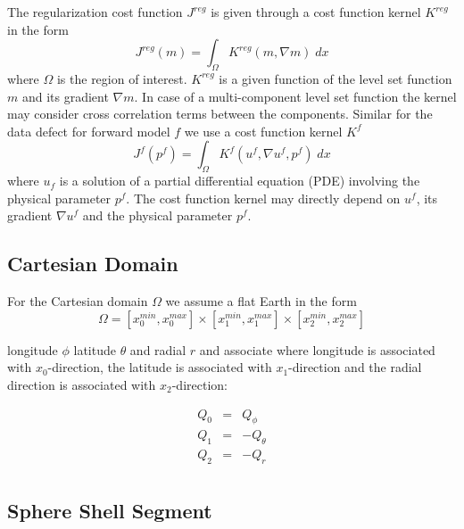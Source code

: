 The regularization cost function $J^{reg}$ is given through a cost function kernel $K^{reg}$ in the form
\begin{equation}\label{REF:EQU:INTRO 2a}
J^{reg}(m) = \int_{\Omega} K^{reg}(m, \nabla m) \; dx
\end{equation} 
where $\Omega$ is the region of interest. $K^{reg}$ is a given function of the level set function $m$ and its gradient $\nabla m$.
In case of a multi-component level set function the kernel may consider cross correlation terms between the components.
Similar for the data defect for forward model $f$ we use a cost function kernel $K^{f}$ 
\begin{equation}\label{REF:EQU:INTRO 2b}
J^{f}(p^f) = \int_{\Omega} K^{f}(u^f, \nabla u^f,p^f) \; dx
\end{equation} 
where $u_f$ is a solution of a partial differential equation (PDE) involving the physical parameter $p^f$. The
cost function kernel may directly depend on $u^f$, its gradient $\nabla u^f$ and the physical parameter $p^f$.


\subsection{Cartesian Domain}
For the Cartesian domain $\Omega$ we assume a flat Earth in the form
\begin{equation} \label{REF:EQU:INTRO 8}
\Omega = [x^{min}_0, x^{max}_0] \times
 [x^{min}_1, x^{max}_1] \times
 [x^{min}_2, x^{max}_2] 
\end{equation} 

longitude $\phi$ latitude $\theta$ and radial $r$
and associate where longitude is associated with $x_0$-direction,
the latitude is associated with $x_1$-direction and the radial direction is associated with $x_2$-direction: 

 \begin{equation}\label{REF:EQU:INTRO 9}
\begin{array}{rcl}
Q_0  & = &  Q_{\phi} \\
Q_1  & = & -Q_{\theta} \\
Q_2  & = & -Q_r \\
\end{array}
\end{equation}

\subsection{Sphere Shell Segment}

 